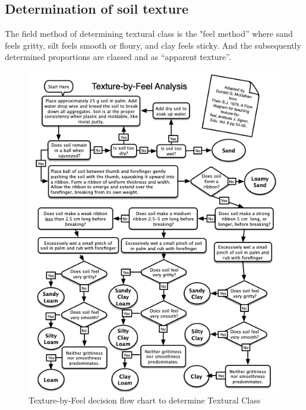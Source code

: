 \documentclass{article}
\begin{document}
    
\subsection{Determination of soil texture}

The field method of determining textural class is the "feel method” where sand feels gritty, silt feels smooth or floury, and clay feels sticky. And the subsequently determined proportions are classed and as “apparent texture”.

\begin{figure}
    \includegraphics[width=0.9\columnwidth]{images/TextureFlowChart.png}
    \caption{Texture-by-Feel decision flow chart to determine Textural Class}
    \label{fig:TextureByFeelFlowChart}
\end{figure}
\end{document}
